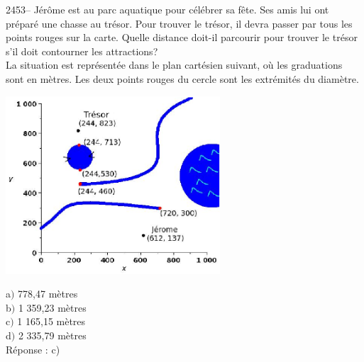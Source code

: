 \documentclass[letterpaper, 12pt]{article}
\begin{document}
2453-- J\'er\^ome est au parc aquatique pour c\'el\'ebrer sa f\^ete. Ses amis lui ont pr\'epar\'e une chasse au tr\'esor. Pour trouver le tr\'esor, il devra passer par tous les points rouges sur la carte. Quelle distance doit-il parcourir pour trouver le tr\'esor s'il doit contourner les attractions?\\
La situation est repr\'esent\'ee dans le plan cart\'esien suivant, o\`u les graduations sont en m\`etres. Les deux points rouges du cercle sont les extr\'emit\'es du diam\`etre.\\
\begin{center}
 \includegraphics[width=8cm,bb=14 14 259 217]{Q2453.eps}
\end{center}

a$)$ 778,47 m\`etres\\
b$)$ 1 359,23 m\`etres\\
c$)$ 1 165,15 m\`etres\\
d$)$ 2 335,79 m\`etres\\

R\'eponse : c)\\
\end{document}
